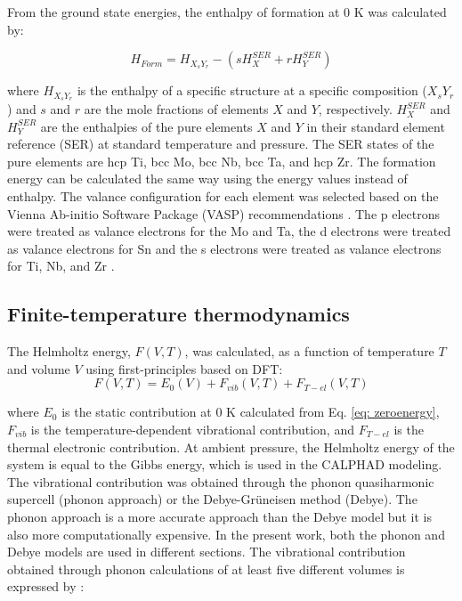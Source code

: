 From the ground state energies, the enthalpy of formation at 0 K was calculated by:

\begin{equation}
\label{eq: hform}
H_{Form} = H_{X_{s}Y_{r}} - \left( s H_{X}^{SER} + rH_{Y}^{SER} \right) 
\end{equation}

\noindent where $H_{X_{s}Y_{r}}$ is the enthalpy of a specific structure at a specific composition ($X_{s}Y_{r}$) and $s$ and $r$ are the mole fractions of elements $X$ and $Y$, respectively. $H_{X}^{SER}$ and $H_{Y}^{SER}$ are the enthalpies of the pure elements $X$ and $Y$ in their standard element reference (SER) at standard temperature and pressure. The SER states of the pure elements are hcp Ti, bcc Mo, bcc Nb, bcc Ta, and hcp Zr. The formation energy can be calculated the same way using the energy values instead of enthalpy. The valance configuration for each element was selected based on the Vienna Ab-initio Software Package (VASP) recommendations \cite{Kresse1996}. The p electrons were treated as valance electrons for the Mo and Ta, the d electrons were treated as valance electrons for Sn and the s electrons were treated as valance electrons for Ti, Nb, and Zr \cite{Kresse1996,Kresse1999}.

\subsection{Finite-temperature thermodynamics}

The Helmholtz energy, $F(V,T)$, was calculated, as a function of temperature $T$ and volume $V$ using first-principles based on DFT:
 \begin{equation}
 \label{eq: helmholtz}
 F(V,T) = E_{0}(V) + F_{vib}(V,T) + F_{T-el}(V,T)
 \end{equation}
 
\noindent where $E_0$ is the static contribution at 0 K calculated from Eq. \ref{eq: zeroenergy}, $F_{vib}$ is the temperature-dependent vibrational contribution, and $F_{T-el}$ is the thermal electronic contribution. At ambient pressure, the Helmholtz energy of the system is equal to the Gibbs energy, which is used in the CALPHAD modeling. The vibrational contribution was obtained through the phonon quasiharmonic supercell (phonon approach) or the Debye-Gr\"uneisen method (Debye). The phonon approach is a more accurate approach than the Debye model but it is also more computationally expensive. In the present work, both the phonon and Debye models are used in different sections. The vibrational contribution obtained through phonon calculations of at least five different volumes is expressed by \cite{Wang2012}:

